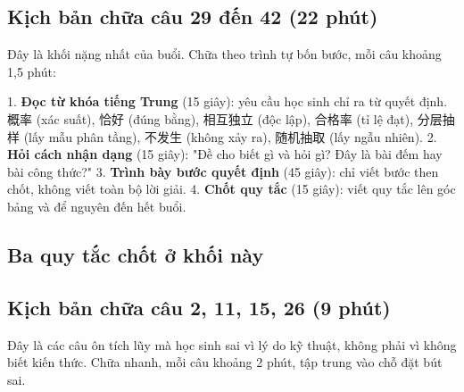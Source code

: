 \documentclass[11pt, a4paper]{article}
\begin{document}
\subsection{Kịch bản chữa câu 29 đến 42 (22 phút)}

Đây là khối nặng nhất của buổi. Chữa theo trình tự bốn bước, mỗi câu khoảng 1,5 phút:

1. \textbf{Đọc từ khóa tiếng Trung} (15 giây): yêu cầu học sinh chỉ ra từ quyết định. 概率 (xác suất), 恰好 (đúng bằng), 相互独立 (độc lập), 合格率 (tỉ lệ đạt), 分层抽样 (lấy mẫu phân tầng), 不发生 (không xảy ra), 随机抽取 (lấy ngẫu nhiên).
2. \textbf{Hỏi cách nhận dạng} (15 giây): "Đề cho biết gì và hỏi gì? Đây là bài đếm hay bài công thức?"
3. \textbf{Trình bày bước quyết định} (45 giây): chỉ viết bước then chốt, không viết toàn bộ lời giải.
4. \textbf{Chốt quy tắc} (15 giây): viết quy tắc lên góc bảng và để nguyên đến hết buổi.

\subsection{Ba quy tắc chốt ở khối này}


\subsection{Kịch bản chữa câu 2, 11, 15, 26 (9 phút)}

Đây là các câu ôn tích lũy mà học sinh sai vì lý do kỹ thuật, không phải vì không biết kiến thức. Chữa nhanh, mỗi câu khoảng 2 phút, tập trung vào chỗ đặt bút sai.
\end{document}
